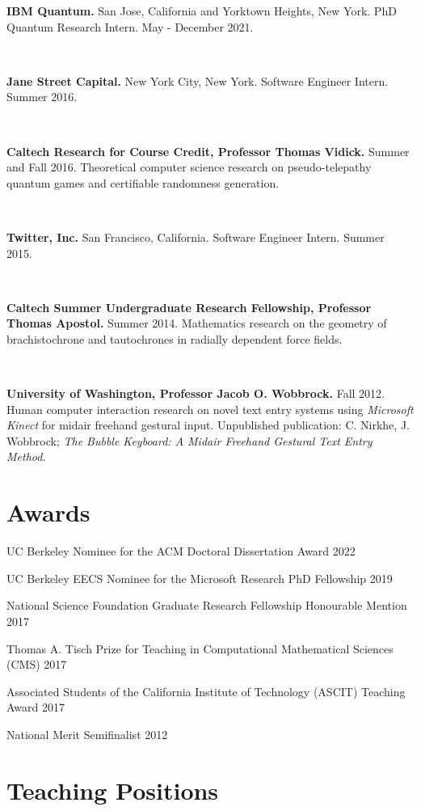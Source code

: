 \documentclass[11pt]{article}
\begin{document}
\textbf{IBM Quantum.}
San Jose, California and Yorktown Heights, New York. PhD Quantum Research Intern. May - December 2021.

\

\textbf{Jane Street Capital.}
New York City, New York. Software Engineer Intern. Summer 2016. 

\

\textbf{Caltech Research for Course Credit, Professor Thomas Vidick.}
Summer and Fall 2016. Theoretical computer science research on pseudo-telepathy quantum games and certifiable randomness generation. 

\

\textbf{Twitter, Inc.}
San Francisco, California. Software Engineer Intern. Summer 2015. 

\	

\textbf{Caltech Summer Undergraduate Research Fellowship, Professor Thomas Apostol.}
Summer 2014. Mathematics research on the geometry of brachistochrone and tautochrones in radially dependent force fields. 

\

\textbf{University of Washington, Professor Jacob O. Wobbrock.}
Fall 2012. Human computer interaction research on novel text entry systems using \emph{Microsoft Kinect} for midair freehand gestural input. Unpublished publication: C. Nirkhe, J. Wobbrock; \emph{The Bubble Keyboard: A Midair Freehand Gestural Text Entry Method.}

\section{Awards}
UC Berkeley Nominee for the ACM Doctoral Dissertation Award 2022

UC Berkeley EECS Nominee for the Microsoft Research PhD Fellowship 2019

National Science Foundation Graduate Research Fellowship Honourable Mention 2017 

Thomas A. Tisch Prize for Teaching in Computational Mathematical Sciences (CMS) 2017

Associated Students of the California Institute of Technology (ASCIT) Teaching Award 2017 

National Merit Semifinalist 2012 \\

\section{Teaching Positions}
\end{document}
